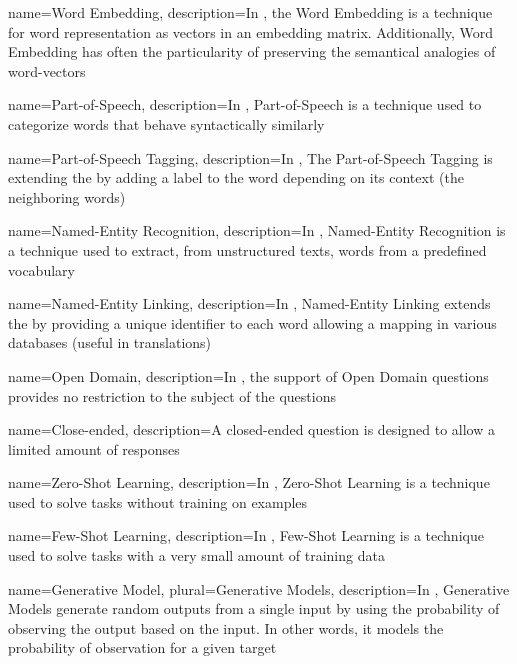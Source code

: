 {
  name={Word Embedding},
  description={In , the Word Embedding is a technique for word representation as vectors in an embedding matrix. Additionally, Word Embedding has often the particularity of preserving the semantical analogies of word-vectors}
}

{
  name={Part-of-Speech},
  description={In , Part-of-Speech is a technique used to categorize words that behave syntactically similarly}
}

{
  name={Part-of-Speech Tagging},
  description={In , The Part-of-Speech Tagging is extending the  by adding a label to the word depending on its context (the neighboring words)}
}


{
  name={Named-Entity Recognition},
  description={In , Named-Entity Recognition is a technique used to extract, from unstructured texts, words from a predefined vocabulary}
}

{
  name={Named-Entity Linking},
  description={In , Named-Entity Linking extends the  by providing a unique identifier to each word allowing a mapping in various databases (useful in translations)}
}

{
  name={Open Domain},
  description={In , the support of Open Domain questions provides no restriction to the subject of the questions}
}

{
  name={Close-ended},
  description={A closed-ended question is designed to allow a limited amount of responses}
}

{
  name={Zero-Shot Learning},
  description={In , Zero-Shot Learning is a technique used to solve tasks without training on examples}
}

{
  name={Few-Shot Learning},
  description={In , Few-Shot Learning is a technique used to solve tasks with a very small amount of training data}
}

{
  name={Generative Model},
  plural={Generative Models},
  description={In , Generative Models generate random outputs from a single input by using the probability of observing the output based on the input. In other words, it models the probability of observation for a given target}
}

